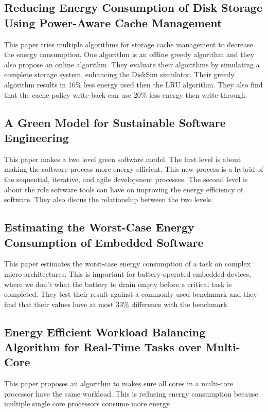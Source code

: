 \subsection{Reducing Energy Consumption of Disk Storage Using Power-Aware Cache Management \cite{zhu2004reducing}}
This paper tries multiple algorithms for storage cache management to decrease the energy consumption. One algorithm is an offline greedy algorithm and they also propose an online algorithm. They evaluate their algorithms by simulating a complete storage system, enhancing the DiskSim simulator. Their greedy algorithm results in 16\% less energy used then the LRU algorithm. They also find that the cache policy write-back can use 20\% less energy then write-through.



\subsection{A Green Model for Sustainable Software Engineering \cite{mahmoud2013green}}
This paper makes a two level green software model. The first level is about making the software process more energy efficient. This new process is a hybrid of the sequential, iterative, and agile development processes. The second level is about the role software tools can have on improving the energy efficiency of software. They also discus the relationship between the two levels.


\subsection{Estimating the Worst-Case Energy Consumption of Embedded Software \cite{jayaseelan2006estimating}}
This paper estimates the worst-case energy consumption of a task on complex micro-architectures. This is important for battery-operated embedded devices, where we don't what the battery to drain empty before a critical task is completed. They test their result against a commonly used benchmark and they find that their values have at most 33\% difference with the benchmark.

\subsection{Energy Efficient Workload Balancing Algorithm for Real-Time Tasks over Multi-Core \cite{zakarya2013energy}}
This paper proposes an algorithm to makes sure all cores in a multi-core processor have the same workload. This is reducing energy consumption because multiple single core processors consume more energy.

